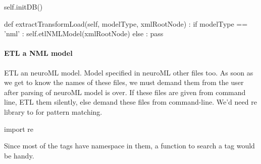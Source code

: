 \documentclass[]{article}%
\begin{document}
\nwenddocs{}\endmoddef\nwstartdeflinemarkup{}\nwenddeflinemarkup
self.initDB()
\nwendcode{}\nwdocspar

\nwenddocs{}\plusendmoddef\nwstartdeflinemarkup{}\nwenddeflinemarkup
def extractTransformLoad(self, modelType, xmlRootNode) :
  if modelType == 'nml' :
    self.etlNMLModel(xmlRootNode)
  else :
      pass 

\eatline
{}\nwendcode{}\nwdocspar

\paragraph{ETL a NML model}

  ETL an neuroML model. Model specified in {\Tt{}neuroML\nwendquote}  other
  files too. As soon as we get to know the names of these files, we must demand
  them from the user after parsing of {\Tt{}neuroML\nwendquote} model is over. If these files
  are given from command line, ETL them silently, else demand these files from
  command-line. We'd need {\Tt{}re\nwendquote} library to for pattern matching. 

\nwenddocs{}\plusendmoddef\nwstartdeflinemarkup{}\nwenddeflinemarkup
import re
\nwendcode{}\nwdocspar

 Since most of the tags have namespace in them, a function to search a tag would
 be handy.
\end{document}
